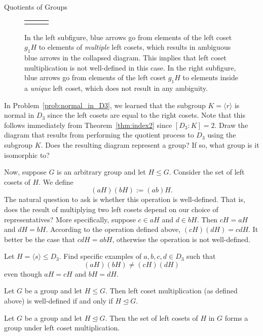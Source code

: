 \begin{section}{Quotients of Groups}
\begin{figure}[!ht]
{\begin{tabular}{ccc}
{\begin{tikzpicture}[scale=1]
\node (g2H) at (0,0) [vert] {\scriptsize $g_2H$};
\draw[b] (g1H) to (g2H);
\end{tikzpicture}}
\end{tabular}
}
\caption{In the left subfigure, blue arrows go from elements of the left coset $g_1H$ to elements of \emph{multiple} left cosets, which results in ambiguous blue arrows in the collapsed diagram. This implies that left coset multiplication is not well-defined in this case. In the right subfigure, blue arrows go from elements of the left coset $g_1H$ to elements inside a \emph{unique} left coset, which does not result in any ambiguity.}
\label{fig:QuotientProcess}
\end{figure}

\begin{problem}
In Problem~\ref{prob:normal_in_D3}, we learned that the subgroup $K=\langle r\rangle$ is normal in $D_3$ since the left cosets are equal to the right cosets.  Note that this follows immediately from Theorem~\ref{thm:index2} since $[D_3:K]=2$.  Draw the diagram that results from performing the quotient process to $D_3$ using the subgroup $K$.  Does the resulting diagram represent a group?  If so, what group is it isomorphic to?
\end{problem}

Now, suppose $G$ is an arbitrary group and let $H\leq G$. Consider the set of left cosets of $H$.  We define
\[
(aH)(bH):=(ab)H.
\]
The natural question to ask is whether this operation is well-defined.  That is, does the result of multiplying two left cosets depend on our choice of representatives?  More specifically, suppose $c\in aH$ and $d\in bH$.  Then $cH=aH$ and $dH=bH$.  According to the operation defined above, $(cH)(dH)=cdH$.  It better be the case that $cdH=abH$, otherwise the operation is not well-defined.

\begin{problem}
Let $H=\langle s\rangle \leq D_3$.  Find specific examples of $a,b,c,d\in D_3$ such that
\[
(aH)(bH)\neq (cH)(dH)
\]
even though $aH=cH$ and $bH=dH$.
\end{problem}

\begin{theorem}
Let $G$ be a group and let $H\leq G$.  Then left coset multiplication (as defined above) is well-defined if and only if $H\trianglelefteq G$.
\end{theorem}

\begin{theorem}\label{thm:quotient_grp}
Let $G$ be a group and let $H\trianglelefteq G$.  Then the set of left cosets of $H$ in $G$ forms a group under left coset multiplication.
\end{theorem}


\end{section}
